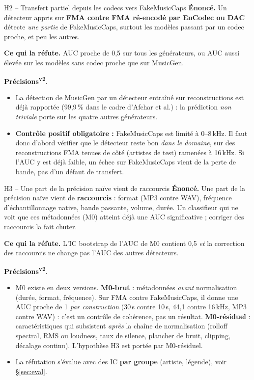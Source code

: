 \documentclass[11pt,a4paper]{article}
\providecommand{\og}{\guillemotleft\nobreakspace}%
\providecommand{\fg}{\nobreakspace\guillemotright}}
\newcommand{\vtwo}{\textsuperscript{\textcolor{orange!80!black}{\textbf{v2}}}}
\begin{document}
\begin{hyp}{H2 -- Transfert partiel depuis les codecs vers FakeMusicCaps}
\textbf{Énoncé.} Un détecteur appris sur \textbf{FMA contre FMA ré-encodé par EnCodec ou DAC} détecte \emph{une partie} de FakeMusicCaps, surtout les modèles passant par un codec proche, et peu les autres.

\textbf{Ce qui la réfute.} AUC proche de 0,5 sur tous les générateurs, ou AUC aussi élevée sur les modèles sans codec proche que sur MusicGen.

\textbf{Précisions}\vtwo.
\begin{itemize}
\item La détection de MusicGen par un détecteur entraîné sur reconstructions est déjà rapportée (99,9\,\% dans le cadre d'Afchar et al.) : la prédiction \emph{non triviale} porte sur les quatre autres générateurs.
\item \textbf{Contrôle positif obligatoire :} FakeMusicCaps est limité à 0--8\,kHz. Il faut donc d'abord vérifier que le détecteur reste bon \emph{dans le domaine}, sur des reconstructions FMA tenues de côté (artistes de test) ramenées à 16\,kHz. Si l'AUC y est déjà faible, un échec sur FakeMusicCaps vient de la perte de bande, pas d'un défaut de transfert.
\end{itemize}
\end{hyp}

\begin{hyp}{H3 -- Une part de la précision \og{}naïve\fg{} vient de raccourcis}
\textbf{Énoncé.} Une part de la précision naïve vient de \textbf{raccourcis} : format (MP3 contre WAV), fréquence d'échantillonnage native, bande passante, volume, durée. Un classifieur qui ne voit que ces métadonnées (M0) atteint déjà une AUC significative ; corriger des raccourcis la fait chuter.

\textbf{Ce qui la réfute.} L'IC bootstrap de l'AUC de M0 contient 0,5 \emph{et} la correction des raccourcis ne change pas l'AUC des autres détecteurs.

\textbf{Précisions}\vtwo.
\begin{itemize}
\item M0 existe en deux versions. \textbf{M0-brut} : métadonnées \emph{avant} normalisation (durée, format, fréquence). Sur FMA contre FakeMusicCaps, il donne une AUC proche de 1 \emph{par construction} (30\,s contre 10\,s, 44,1 contre 16\,kHz, MP3 contre WAV) : c'est un contrôle de cohérence, pas un résultat. \textbf{M0-résiduel} : caractéristiques qui subsistent \emph{après} la chaîne de normalisation (rolloff spectral, RMS ou loudness, taux de silence, plancher de bruit, clipping, décalage continu). L'hypothèse H3 est portée par M0-résiduel.
\item La réfutation s'évalue avec des IC \textbf{par groupe} (artiste, légende), voir §\ref{sec:eval}.
\end{itemize}
\end{hyp}
\end{document}
